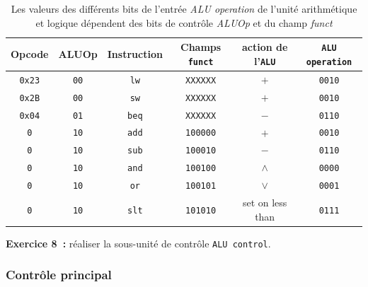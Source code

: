 \documentclass[12pt]{article}
\begin{document}
\begin{table}[!htpb]
\begin{center}
\begin{tabular}{|c|c|c|c|c|c|}
\hline
Opcode & ALUOp & Instruction & Champs \verb+funct+ & action de l'\verb+ALU+ & \verb+ALU operation+ \\
\hline
\hline
\verb+0x23+ & \verb+00+ & \verb+lw+ & \verb+XXXXXX+ & $+$ & \verb+0010+\\
\hline
\verb+0x2B+ & \verb+00+ & \verb+sw+ & \verb+XXXXXX+ & $+$ & \verb+0010+\\
\hline
\verb+0x04+ & \verb+01+ & \verb+beq+ & \verb+XXXXXX+ & $-$ & \verb+0110+\\
\hline
\verb+0+ & \verb+10+ & \verb+add+ & \verb+100000+ & $+$ & \verb+0010+\\
\hline
\verb+0+ & \verb+10+ & \verb+sub+ & \verb+100010+ & $-$ & \verb+0110+\\
\hline
\verb+0+ & \verb+10+ & \verb+and+ & \verb+100100+ & $\wedge$ & \verb+0000+\\
\hline
\verb+0+ & \verb+10+ & \verb+or+ & \verb+100101+ & $\vee$ & \verb+0001+\\
\hline
\verb+0+ & \verb+10+ & \verb+slt+ & \verb+101010+ & set on less than & \verb+0111+\\
\hline
\end{tabular}
\end{center}
\caption{Les valeurs des différents bits de l'entrée \emph{ALU operation} de l'unité arithmétique et logique dépendent
des bits de contrôle \emph{ALUOp} et du champ \emph{funct}}
\label{table:aluop}
\end{table}

\textbf{Exercice 8~:} réaliser la sous-unité de contrôle \verb+ALU control+.\\

\subsubsection{Contrôle principal}
\end{document}
